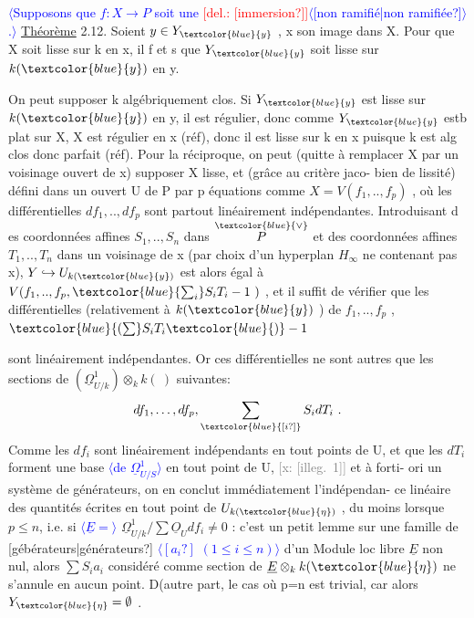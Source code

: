 \documentclass[11pt]{article}
\newcommand{\scanpage}[1]{\par\bigskip\noindent{\small\sffamily[scan #1]}\par}
\newcommand{\mspage}[1]{{\small\sffamily[p.\,#1]}}
\newcommand{\hand}[1]{\textcolor{blue}{#1}}
\newcommand{\inserted}[2][]{\textcolor{blue}{$\langle$#2$\rangle$}}
\newcommand{\deleted}[1]{\textcolor{red}{[\textsf{del.:} #1]}}
\newcommand{\xout}[1]{\textcolor{gray}{[\textsf{x:} #1]}}
\newcommand{\uline}[1]{\underline{#1}}
\newcommand{\unsure}[1]{[#1?]}
\newcommand{\illegible}[1]{[\textsf{illeg.\ #1}]}
\begin{document}
\inserted[typed]{Supposons que $f:X\to P$ soit une \deleted{\unsure{immersion}}\inserted{\unsure{non ramifié|non ramifiée}}.}
\uline{Théorème} 2.12. Soient $y\in Y_{\hand{y}}$ , x son image dans X. Pour que X soit
lisse sur k en x, il f et s que $Y_{\hand{y}}$ soit lisse sur $k(\hand{y})$ en y.

On peut supposer k algébriquement clos. Si $Y_{\hand{y}}$ est lisse sur $k(\hand{y})$
en y, il est régulier, donc comme $Y_{\hand{y}}$ estb plat sur X, X est régulier
en x (réf), donc il est lisse sur k en x puisque k est alg clos donc
parfait (réf). Pour la réciproque, on peut (quitte à remplacer X par
un voisinage ouvert de x) supposer X lisse, et (grâce au critère jaco-%
bien de lissité) défini dans un ouvert U de P par p équations
comme $X=V(f_1,..,f_p)$ , où les différentielles $df_1,..,df_p$ sont
partout linéairement indépendantes. Introduisant d es coordonnées affines
$S_1,..,S_n$ dans $\overset{\hand{\vee}}{P}$ et des coordonnées affines $T_1,..,T_n$ dans un voisinage
de x (par choix d'un hyperplan $H_\infty$ ne contenant pas x), $Y\hookrightarrow U_{k(\hand{y})}$ est
alors égal à $V(f_1,..,f_p,\hand{\sum_i}S_iT_i-1\ )$ , et il suffit de vérifier que
les différentielles (relativement à $k(\hand{y})$ ) de $f_1,..,f_p$ ,$\hand{(\sum}S_iT_i\hand{)}-1$

\mspage{\hand{12}}

\clearpage
\scanpage{25/13}
\mspage{\hand{10}}

sont linéairement indépendantes. Or ces différentielles ne sont autres
que les sections de $(\underline{\Omega}^1_{U/k})\otimes_k k(\ )$ suivantes:
\[ df_1, \ldots, df_p , \sum_{\hand{\unsure{i}}} S_i dT_i \ . \]
Comme les $df_i$ sont linéairement indépendants en tout points de U, et
que les $dT_i$ forment une base \inserted{de $\underline{\Omega}^1_{U/S}$} en tout point de U, \xout{\illegible{1}} et à forti-%
ori un système de générateurs, on en conclut immédiatement l'indépendan-%
ce linéaire des quantités écrites en tout point de $U_{k(\hand{\eta})}$ , du moins
lorsque $p\leq n$, i.e. si \inserted{$\underline{E} =$} $\underline{\Omega}^1_{U/k} / \sum \underline{O}_U df_i \neq 0$ : c'est un petit
lemme sur une famille de \unsure{gébérateurs|générateurs} \inserted{$\unsure{a_i}$ $(1 \leq i \leq n)$} d'un Module loc libre $\underline{E}$ non
nul, alors $\sum S_i a_i$ considéré comme section de $\underline{E}\otimes_k k(\hand{\eta})$ ne s'annule
en aucun point. D(autre part, le cas où p=n est trivial, car alors
$Y_{\hand{\eta}} = \emptyset$ .
\end{document}
